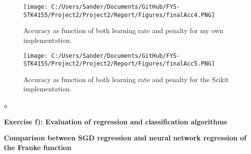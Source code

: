 \documentclass[12pt,a4paper]{article}
\begin{document}
\begin{figure}[H]
\centering
\texttt{[image: C:/Users/Sander/Documents/GitHub/FYS-STK4155/Project2/Project2/Report/Figures/finalAcc4.PNG]}
\caption{\label{fig:finalAcc4} Accuracy as function of both learning rate and penalty for my own implementation.}
\end{figure}

\begin{figure}[H]
\centering
\texttt{[image: C:/Users/Sander/Documents/GitHub/FYS-STK4155/Project2/Project2/Report/Figures/finalAcc5.PNG]}
\caption{\label{fig:finalAcc5} Accuracy as function of both learning rate and penalty for the Scikit implementation.}
\end{figure}

\noindent a

\newpage

\begin{center}
\Large{\textbf{Exercise f): Evaluation of regression and classification algorithms}}
\end{center}

\begin{center}
\large{\textbf{Comparison between SGD regression and neural network regression of the Franke function}}
\end{center}
\end{document}
